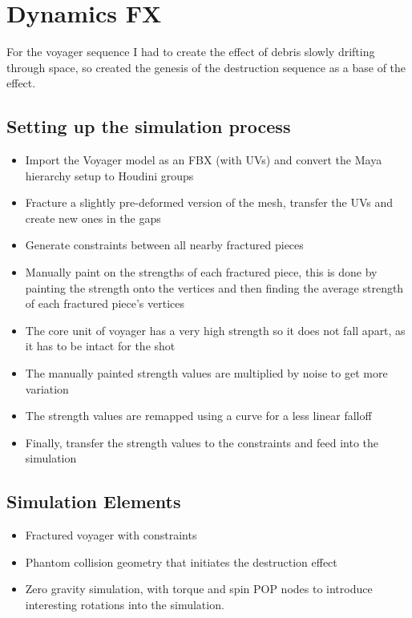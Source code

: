 \documentclass[11pt,a4paper,final,notitlepage]{report}
\begin{document}
\chapter{Dynamics FX}

For the voyager sequence I had to create the effect of debris slowly drifting through space, so created the genesis of the destruction sequence as a base of the effect.

\section{Setting up the simulation process}
\begin{itemize}
	\item Import the Voyager model as an FBX (with UVs) and convert the Maya hierarchy setup to Houdini groups
	\item Fracture a slightly pre-deformed version of the mesh, transfer the UVs and create new ones in the gaps
	\item Generate constraints between all nearby fractured pieces
	\item Manually paint on the strengths of each fractured piece, this is done by painting the strength onto the vertices and then finding the average strength of each fractured piece's vertices
	\item The core unit of voyager has a very high strength so it does not fall apart, as it has to be intact for the shot
	\item The manually painted strength values are multiplied by noise to get more variation
	\item The strength values are remapped using a curve for a less linear falloff
	\item Finally, transfer the strength values to the constraints and feed into the simulation
\end{itemize}

\section{Simulation Elements}
\begin{itemize}
	\item Fractured voyager with constraints
	\item Phantom collision geometry that initiates the destruction effect
	\item Zero gravity simulation, with torque and spin POP nodes to introduce interesting rotations into the simulation.
\end{itemize}
\end{document}

